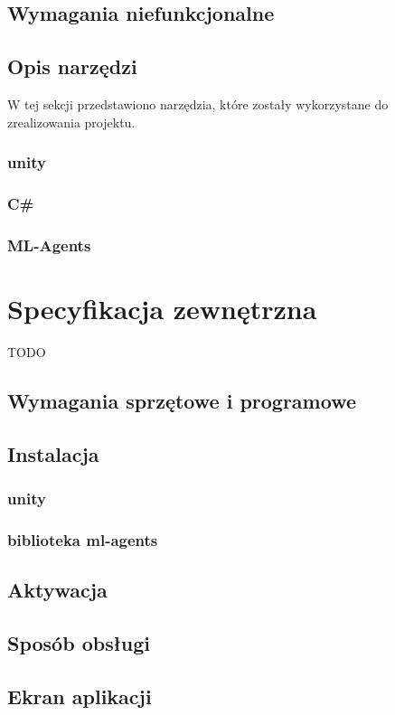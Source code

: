 \documentclass[a4paper,twoside,12pt]{book}
\begin{document}
\section{Wymagania niefunkcjonalne}
\section{Opis narzędzi}
W tej sekcji przedstawiono narzędzia, które zostały wykorzystane do zrealizowania projektu.
\subsection{unity}
\subsection{C\#}
\subsection{ML-Agents}




\chapter{Specyfikacja zewnętrzna}%
\label{ch:04}
TODO
\section{Wymagania sprzętowe i programowe}
\section{Instalacja}
\subsection{unity}
\subsection{biblioteka ml-agents}
\section{Aktywacja}
\section{Sposób obsługi}
\section{Ekran aplikacji}
\end{document}
